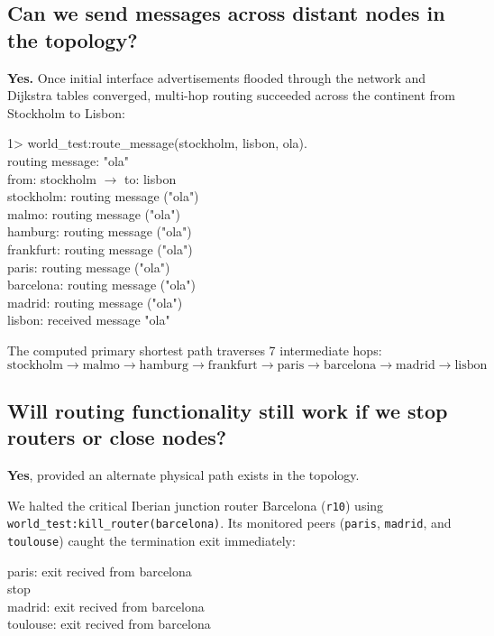 \documentclass[a4paper, 11pt]{article}
\begin{document}
\subsection{Can we send messages across distant nodes in the topology?}
\textbf{Yes.} Once initial interface advertisements flooded through the network and Dijkstra tables converged, multi-hop routing succeeded across the continent from Stockholm to Lisbon:
\begin{tcolorbox}[terminalbox]
1> world\_test:route\_message(stockholm, lisbon, ola). \\
routing message: "ola" \\
from: stockholm $\rightarrow$ to: lisbon \\
stockholm: routing message ("ola") \\
malmo: routing message ("ola") \\
hamburg: routing message ("ola") \\
frankfurt: routing message ("ola") \\
paris: routing message ("ola") \\
barcelona: routing message ("ola") \\
madrid: routing message ("ola") \\
lisbon: received message "ola"
\end{tcolorbox}
\noindent The computed primary shortest path traverses 7 intermediate hops:
$$\text{stockholm} \rightarrow \text{malmo} \rightarrow \text{hamburg} \rightarrow \text{frankfurt} \rightarrow \text{paris} \rightarrow \text{barcelona} \rightarrow \text{madrid} \rightarrow \text{lisbon}$$

\subsection{Will routing functionality still work if we stop routers or close nodes?}
\textbf{Yes}, provided an alternate physical path exists in the topology.

We halted the critical Iberian junction router Barcelona (\texttt{r10}) using \texttt{world\_test:kill\_router(barcelona)}. Its monitored peers (\texttt{paris}, \texttt{madrid}, and \texttt{toulouse}) caught the termination exit immediately:
\begin{tcolorbox}[terminalbox]
paris: exit recived from barcelona \\
stop \\
madrid: exit recived from barcelona \\
toulouse: exit recived from barcelona
\end{tcolorbox}
\end{document}
